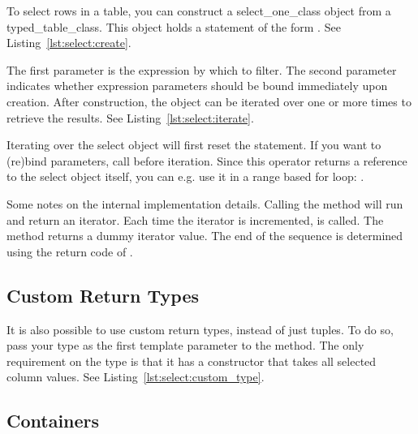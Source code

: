 To select rows in a table, you can construct a \gls{select_one_class} object from a \gls{typed_table_class}. This object holds a statement of the form \newline {}. See Listing~\ref{lst:select:create}.



The first parameter is the expression by which to filter. The second parameter indicates whether expression parameters should be bound immediately upon creation. After construction, the object can be iterated over one or more times to retrieve the results. See Listing~\ref{lst:select:iterate}.



Iterating over the select object will first reset the statement. If you want to (re)bind parameters, call  before iteration. Since this operator returns a reference to the select object itself, you can e.g. use it in a range based for loop: .

Some notes on the internal implementation details. Calling the  method will run  and return an iterator. Each time the iterator is incremented,  is called. The  method returns a dummy iterator value. The end of the sequence is determined using the return code of .

\subsection{Custom Return Types}
\label{section:select:custom}

It is also possible to use custom return types, instead of just tuples. To do so, pass your type as the first template parameter to the  method. The only requirement on the type is that it has a constructor that takes all selected column values. See Listing~\ref{lst:select:custom_type}.



\subsection{Containers}
\label{section:select:container}

